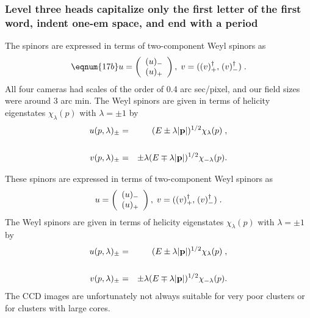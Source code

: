 \begin{article}
\subsubsection{Level three heads capitalize only 
the first letter of the first word, indent one-em 
space, and end with a period}
The spinors are expressed in terms 
of two-component Weyl spinors as
\begin{equation}
\eqnum{17b}      %
   u=\left(\begin{array}{c}(u)_-\\(u)
   _+\end{array}\right),\;v={\bf 
   (}(v)^\dagger_+{\bf ,} \; (v)^\dagger_-{\bf )}\;.
\end{equation}
All four cameras had scales of the order of 0.4 arc 
sec/pixel, and our field sizes were around 3 arc min.  
The Weyl spinors are given in terms of helicity 
eigen\-states $\chi_\lambda(p)$ with $\lambda=\pm1$ by
\begin{eqnarray}
   u(p, \lambda)_\pm & = & 
   (E\pm\lambda|{\bf p}|)^{1/2}\chi_\lambda(p)\;, 
   \nonumber \\ & & \\v(p,\lambda)_\pm & = & 
   \pm\lambda(E\mp\lambda|
   {\bf p}|)^{1/2}\chi_{-\lambda}(p). \nonumber
\end{eqnarray}

These spinors are expressed in terms 
of two-component Weyl spinors as 
\begin{equation}
   u=\left(\begin{array}{c}(u)_-\\(u)
   _+\end{array}\right),\;v={\bf (}(v)^\dagger_+{\bf ,} 
   \; (v)^\dagger_-{\bf )}\;.
\end{equation}
The Weyl spinors are given in terms of helicity 
eigen\-states $\chi_\lambda(p)$ with $\lambda=\pm1$ 
by
\begin{eqnarray}u(p, \lambda)_\pm & = & 
   (E\pm\lambda|{\bf p}|)^{1/2}\chi_\lambda(p)\;, 
   \nonumber \\ & & \\v(p,\lambda)_\pm & = & 
   \pm\lambda(E\mp\lambda|{\bf 
   p}|)^{1/2}\chi_{-\lambda}(p). \nonumber
\end{eqnarray}
The CCD images are unfortunately not always suitable 
for very poor clusters or for clusters with large cores.


\end{article}

